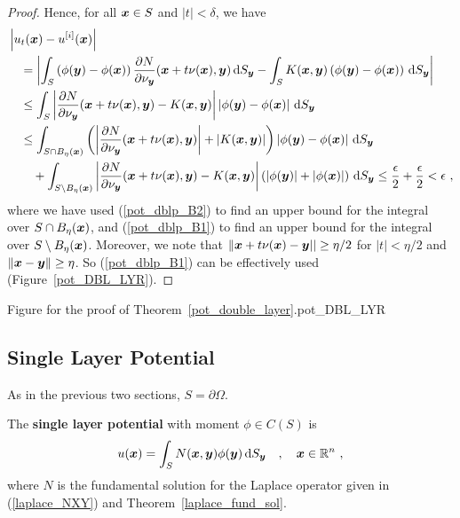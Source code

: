 \begin{proof}
Hence, for all ${\bm{x}} \in S$ and $|t|<\delta$, we have
\begin{align*}
&\left| u_t({\bm{x}}) - u^{[i]}({\bm{x}}) \right| \\
&\quad = \left| \int_S \left( \phi({\bm{y}}) - \phi({\bm{x}}) \right) 
\frac{\partial{N}}{\partial \nu_{{\bm{y}}}}({\bm{x}} +t \nu({\bm{x}}),{\bm{y}})
\,\mathrm{d}{S}_{{\bm{y}}} - \int_S K({\bm{x}},{\bm{y}})
\left( \phi({\bm{y}}) - \phi({\bm{x}}) \right) \,\mathrm{d}{S}_{{\bm{y}}} \right| \\
&\quad \leq \int_S \left|
\frac{\partial{N}}{\partial \nu_{{\bm{y}}}}({\bm{x}} +t \nu({\bm{x}}),{\bm{y}})
- K({\bm{x}},{\bm{y}}) \right|
\left| \phi({\bm{y}}) - \phi({\bm{x}}) \right| \,\mathrm{d}{S}_{{\bm{y}}} \\
&\quad\leq \int_{S \cap B_{\eta}({\bm{x}})} \left(
\left|
\frac{\partial{N}}{\partial \nu_{{\bm{y}}}}({\bm{x}} +t \nu({\bm{x}}),{\bm{y}}) \right|
+\left| K({\bm{x}},{\bm{y}}) \right| \right)
\left| \phi({\bm{y}}) - \phi({\bm{x}}) \right| \,\mathrm{d}{S}_{{\bm{y}}} \\
&\qquad + \int_{S \setminus B_{\eta}({\bm{x}})}
\left| \frac{\partial{N}}{\partial \nu_{{\bm{y}}}}({\bm{x}} +t \nu({\bm{x}}),{\bm{y}})
- K({\bm{x}},{\bm{y}}) \right|
\left( \left| \phi({\bm{y}})\right|
+ \left|\phi({\bm{x}}) \right| \right) \,\mathrm{d}{S}_{{\bm{y}}}
\leq \frac{\epsilon}{2} + \frac{\epsilon}{2} < \epsilon \ ,
\end{align*}
where we have used (\ref{pot_dblp_B2}) to find an upper bound for the
integral over $S \cap B_{\eta}({\bm{x}})$, and (\ref{pot_dblp_B1}) to
find an upper bound for the integral over $S \setminus B_{\eta}({\bm{x}})$.
Moreover, we note that
$\| {\bm{x}} + t \nu({\bm{x}}) - {\bm{y}} || \geq \eta/2$
for $|t| < \eta/2$ and $\|{\bm{x}} - {\bm{y}} \| \geq \eta$.  So
(\ref{pot_dblp_B1}) can be effectively used (Figure~\ref{pot_DBL_LYR}).
\end{proof}

{Figure for the proof of Theorem~\ref{pot_double_layer}.}{pot_DBL_LYR}

\subsection{Single Layer Potential} \label{subsect_SLpot}

As in the previous two sections, $S = \partial \Omega$.

\begin{defn} \label{pot_spl_def}
The {\bfseries single layer potential} with moment
$\phi \in C(S)$ is
\[
u({\bm{x}}) = \int_S
N({\bm{x}},{\bm{y}}) \phi({\bm{y}}) \,\mathrm{d}{S}_{{\bm{y}}} \quad , \quad
{\bm{x}} \in \mathbb{R}^n \ ,
\]
where $N$ is the fundamental solution for the Laplace operator given in
(\ref{laplace_NXY}) and Theorem~\ref{laplace_fund_sol}.
\end{defn}

